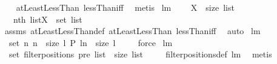 \begin{isabellebody}
%
\isadelimproof
\ \ %
\endisadelimproof
%
\isatagproof
{}\isamarkupfalse%
\ atLeast{}LessThan\ lessThan{\isacharunderscore}iff\ \isamarkupfalse%
\ metis%
\endisatagproof
{\isafoldproof}%
%
\isadelimproof
\isanewline
%
\endisadelimproof
\isanewline
\isanewline
{}\isamarkupfalse%
\ lm{}{}{}{\isacharcolon}\ \isanewline
\ \ \ {\isachardoublequoteopen}X\ {\isasymsubseteq}\ {\isacharbraceleft}{}{\isachardot}{\isachardot}{\isacharless}size\ list{\isacharbraceright}{\isachardoublequoteclose}\ \isanewline
\ \ \ {\isachardoublequoteopen}{\isacharparenleft}nth\ list{\isacharparenright}{\isacharbackquote}X\ {\isasymsubseteq}\ set\ list{\isachardoublequoteclose}\ \isanewline
%
\isadelimproof
\ \ %
\endisadelimproof
%
\isatagproof
{}\isamarkupfalse%
\ assms\ atLeastLessThan{\isacharunderscore}def\ atLeast{}LessThan\ lessThan{\isacharunderscore}iff\ \isamarkupfalse%
\ auto%
\endisatagproof
{\isafoldproof}%
%
\isadelimproof
\isanewline
%
\endisadelimproof
\isanewline
\isanewline
{}\isamarkupfalse%
\ lm{}{}{}{\isacharcolon}\ \isanewline
\ \ {\isachardoublequoteopen}set\ {\isacharparenleft}{\isacharbrackleft}n{\isachardot}\ n\ {\isasymleftarrow}\ {\isacharbrackleft}{}{\isachardot}{\isachardot}{\isacharless}size\ l{\isacharbrackright}{\isacharcomma}\ P\ {\isacharparenleft}l{\isacharbang}n{\isacharparenright}{\isacharbrackright}{\isacharparenright}\ {\isasymsubseteq}\ {\isacharbraceleft}{}{\isachardot}{\isachardot}{\isacharless}size\ l{\isacharbraceright}{\isachardoublequoteclose}\ \isanewline
%
\isadelimproof
\ \ %
\endisadelimproof
%
\isatagproof
{}\isamarkupfalse%
\ force%
\endisatagproof
{\isafoldproof}%
%
\isadelimproof
\isanewline
%
\endisadelimproof
\isanewline
\isanewline
{}\isamarkupfalse%
\ lm{}{}{}{\isacharcolon}\ \isanewline
\ \ {\isachardoublequoteopen}set\ {\isacharparenleft}filterpositions{}\ pre\ list{\isacharparenright}\ {\isasymsubseteq}\ {\isacharbraceleft}{}{\isachardot}{\isachardot}{\isacharless}size\ list{\isacharbraceright}{\isachardoublequoteclose}\ \isanewline
%
\isadelimproof
\ \ %
\endisadelimproof
%
\isatagproof
{}\isamarkupfalse%
\ filterpositions{}{\isacharunderscore}def\ lm{}{}{}\ \isamarkupfalse%
\ metis%
\endisatagproof

\end{isabellebody}
